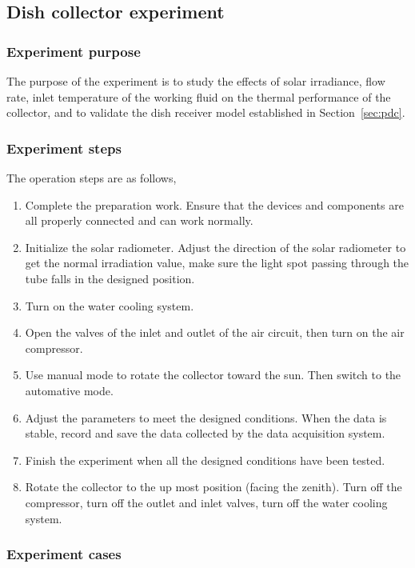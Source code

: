 \subsection{Dish collector experiment}
\subsubsection{Experiment purpose}
The purpose of the experiment is to study the effects of solar irradiance, flow rate, inlet temperature of the working fluid on the thermal performance of the collector, and to validate the dish receiver model established in Section~\ref{sec:pdc}.

\subsubsection{Experiment steps}
 The operation steps are as follows,
\begin{enumerate}[label=(\arabic*)]
	\item Complete the preparation work. Ensure that the devices and components are all properly connected and can work normally.
	\item Initialize the solar radiometer. Adjust the direction of the solar radiometer to get the normal irradiation value, make sure the light spot passing through the tube falls in the designed position.
	\item Turn on the water cooling system.
	\item Open the valves of the inlet and outlet of the air circuit, then turn on the air compressor.
	\item Use manual mode to rotate the collector toward the sun. Then switch to the automative mode.
	\item Adjust the parameters to meet the designed conditions. When the data is stable, record and save the data collected by the data acquisition system.
	\item Finish the experiment when all the designed conditions have been tested. 
	\item Rotate the collector to the up most position (facing the zenith). Turn off the compressor, turn off the outlet and inlet valves, turn off the water cooling system.
\end{enumerate}

\subsubsection{Experiment cases}

